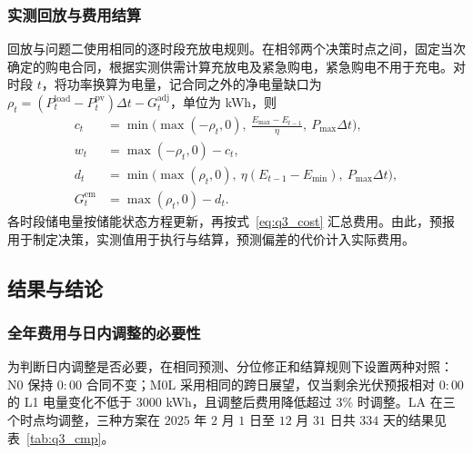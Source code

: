 \subsubsection{实测回放与费用结算}

回放与问题二使用相同的逐时段充放电规则。在相邻两个决策时点之间，固定当次确定的购电合同，根据实测供需计算充放电及紧急购电，紧急购电不用于充电。对时段 $t$，将功率换算为电量，记合同之外的净电量缺口为 $\rho_t=(P^{\mathrm{load}}_t-P^{\mathrm{pv}}_t)\Delta t-G^{\mathrm{adj}}_t$，单位为 kWh，则
\begin{align}
  c_t&=\min\!\big(\max(-\rho_t,0),\ \tfrac{E_{\max}-E_{t-1}}{\eta},\ P_{\max}\Delta t\big), \label{eq:q3_charge}\\[2pt]
  w_t&=\max(-\rho_t,0)-c_t, \label{eq:q3_curtail}\\[2pt]
  d_t&=\min\!\big(\max(\rho_t,0),\ \eta(E_{t-1}-E_{\min}),\ P_{\max}\Delta t\big), \label{eq:q3_discharge}\\[2pt]
  G^{\mathrm{em}}_t&=\max(\rho_t,0)-d_t. \label{eq:q3_em}
\end{align}
各时段储电量按储能状态方程更新，再按式~\eqref{eq:q3_cost} 汇总费用。由此，预报用于制定决策，实测值用于执行与结算，预测偏差的代价计入实际费用。

\subsection{结果与结论}

\subsubsection{全年费用与日内调整的必要性}

为判断日内调整是否必要，在相同预测、分位修正和结算规则下设置两种对照：N0 保持 $0{:}00$ 合同不变；M0L 采用相同的跨日展望，仅当剩余光伏预报相对 $0{:}00$ 的 L1 电量变化不低于 $3000$ kWh，且调整后费用降低超过 $3\%$ 时调整。LA 在三个时点均调整，三种方案在 $2025$ 年 $2$ 月 $1$ 日至 $12$ 月 $31$ 日共 $334$ 天的结果见表~\ref{tab:q3_cmp}。

